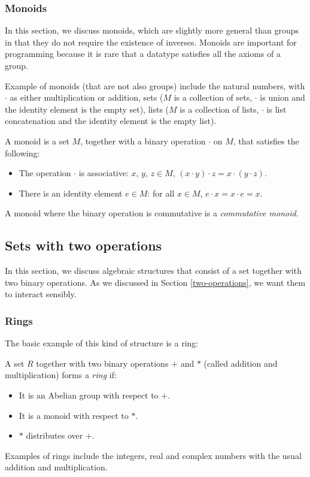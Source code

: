 \subsubsection{Monoids}
In this section, we discuss monoids, which are slightly more general than groups in that they do not require the existence of inverses. Monoids are important for programming because it is rare that a datatype satisfies all the axioms of a group.

Example of monoids (that are not also groups) include the natural numbers, with $\cdot$ as either multiplication or addition, sets ($M$ is a collection of sets, $\cdot$ is union and the identity element is the empty set), lists ($M$ is a collection of lists, $\cdot$ is list concatenation and the identity element is the empty list).

\begin{Definition}
  A monoid is a set $M$, together with a binary operation $\cdot$ on $M$, that satisfies the following:
  \begin{itemize}
  \item The operation $\cdot$ is associative: $x$, $y$, $z \in M$, $(x \cdot y) \cdot z = x \cdot (y \cdot z)$. 
  \item There is an identity element $e \in M$: for all $x \in M$, $e \cdot x = x \cdot e = x$.
  \end{itemize}
A monoid where the binary operation is commutative is a \emph{commutative monoid}.
\end{Definition}



\subsection{Sets with two operations}
\label{Set-with-two-op}
In this section, we discuss algebraic structures that consist of a set together with two binary operations. As we discussed in Section \ref{two-operations}, we want them to interact sensibly.
\subsubsection{Rings}
The basic example of this kind of structure is a ring:
\begin{Definition}
A set $R$ together with two binary operations $+$ and $*$ (called addition and multiplication) forms a \emph{ring} if:
\begin{itemize}
\item It is an Abelian group with respect to $+$.
\item It is a monoid with respect to $*$.
\item $*$ distributes over $+$.
\end{itemize}
\end{Definition}
Examples of rings include the integers, real and complex numbers with the usual addition and multiplication.


